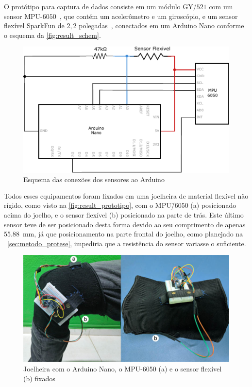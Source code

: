O protótipo para captura de dados consiste em um módulo GY\=/\(521\) com um sensor MPU-\(6050\)~\cite{invensense:imu_mpu}, que contém um acelerômetro e um giroscópio, e um sensor flexível SparkFun de \(2{,}2\) polegadas~\cite{flex:datasheet}, conectados em um Arduino Nano conforme o esquema da \autoref{fig:result_schem}.

\begin{figure}[ht]
	\caption{\label{fig:result_schem}Esquema das conexões dos sensores ao Arduino}
	\begin{center}
	    \includegraphics[width=.8\textwidth]{resources/result_schem}
	\end{center}
\end{figure}

Todos esses equipamentos foram fixados em uma joelheira de material flexível não rígido, como visto na \autoref{fig:result_prototipo}, com o MPU\=/\(6050\) (a) posicionado acima do joelho, e o sensor flexível (b) posicionado na parte de trás. Este último sensor teve de ser posicionado desta forma devido ao seu comprimento de apenas \SI{55.88}{\milli\meter}, já que posicionamento na parte frontal do joelho, como planejado na ~\autoref{sec:metodo_protese}, impediria que a resistência do sensor variasse o suficiente.

\begin{figure}[ht]
	\caption{\label{fig:result_prototipo}Joelheira com o Arduino Nano, o MPU-6050 (a) e o sensor flexível (b) fixados}
	\begin{center}
	    \includegraphics[width=.8\textwidth]{resources/result_prototipo}
	\end{center}
\end{figure}

